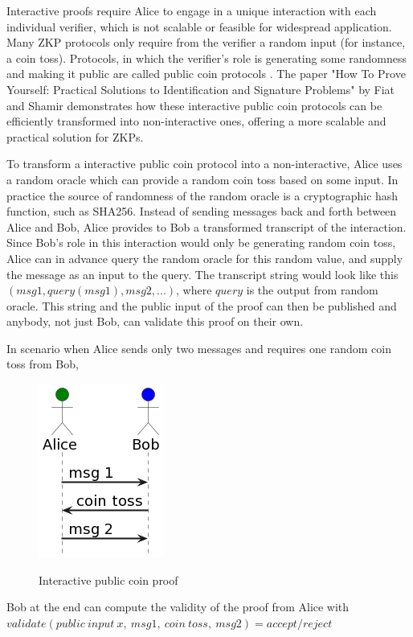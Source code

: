 Interactive proofs require Alice to engage in a unique interaction with each
individual verifier, which is not scalable or feasible for widespread
application. Many ZKP protocols only require from the verifier a random input
(for instance, a coin toss). Protocols, in which the verifier's role is
generating some randomness and making it public are called public coin protocols \cite{Babai1988,Goldwasser1986}.
The paper "How To Prove Yourself: Practical Solutions to Identification and
Signature Problems"\cite{Fiat} by Fiat and Shamir demonstrates how these
interactive public coin protocols can be efficiently transformed into
non-interactive ones, offering a more scalable and practical solution for ZKPs.

To transform a interactive public coin protocol into a non-interactive,
Alice uses a random oracle which can provide a random coin toss based on some
input. In practice the source of randomness of the random oracle is a
cryptographic hash function, such as SHA256. Instead of sending messages back
and forth between Alice and Bob, Alice provides to Bob a transformed
transcript of the interaction. Since Bob's role in this interaction would only
be generating random coin toss, Alice can in advance query the random oracle
for this random value, and supply the message as an input to the query. The
transcript string would look like this $(msg1, query(msg1), msg2, ...)$, where $query$ is
the output from random oracle. This string and the public input of the proof
can then be published and anybody, not just Bob, can validate this proof
on their own.

In scenario when Alice sends only two messages and requires one random coin toss
from Bob,
\begin{figure}[h]
    \centering
    \includegraphics[scale=0.6]{assets/images/interactive_coin.png}
    \caption{Interactive public coin proof}
    \label{fig:interactive_coin}
	\cite{Goldwasser1986, youtubeMOOCLecture1}
    \vspace{0.5cm}
\end{figure}
Bob at the end can compute the validity of the proof from Alice with
$validate(public\:input\:x,\:msg1,\:coin\:toss,\:msg2) = accept/reject$

